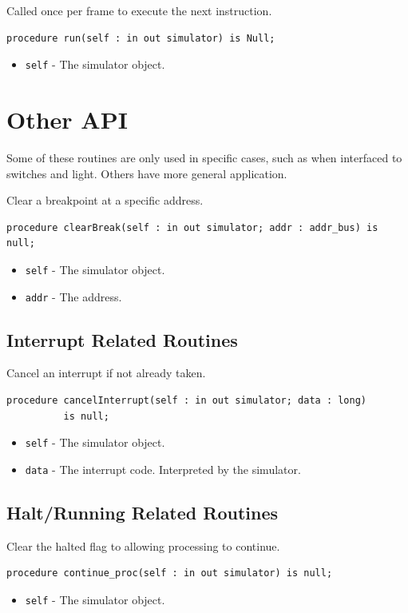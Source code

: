 \documentclass[10pt, openany]{book}
\newcommand{\keyword}[1]{\texttt{#1}}
\begin{document}
Called once per frame to execute the next instruction.
\begin{lstlisting}
procedure run(self : in out simulator) is Null;
\end{lstlisting}
\begin{itemize}
  \item \keyword{self} - The simulator object.
\end{itemize}

\section{Other API}
Some of these routines are only used in specific cases, such as when interfaced to switches and light.
Others have more general application.

Clear a breakpoint at a specific address.
\begin{lstlisting}
procedure clearBreak(self : in out simulator; addr : addr_bus) is null;
\end{lstlisting}
\begin{itemize}
  \item \keyword{self} - The simulator object.
  \item \keyword{addr} - The address.
\end{itemize}

\subsection{Interrupt Related Routines}
Cancel an interrupt if not already taken.
\begin{lstlisting}
procedure cancelInterrupt(self : in out simulator; data : long)
          is null;
\end{lstlisting}
\begin{itemize}
  \item \keyword{self} - The simulator object.
  \item \keyword{data} - The interrupt code.  Interpreted by the simulator.
\end{itemize}

\subsection{Halt/Running Related Routines}
Clear the halted flag to allowing processing to continue.
\begin{lstlisting}
procedure continue_proc(self : in out simulator) is null;
\end{lstlisting}
\begin{itemize}
  \item \keyword{self} - The simulator object.
\end{itemize}
\end{document}
